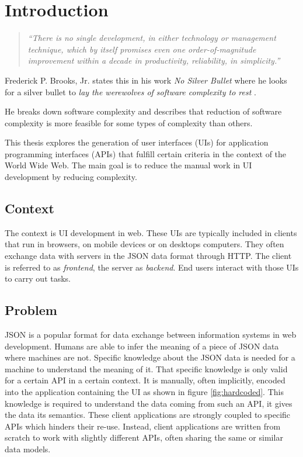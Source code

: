 \section{Introduction}\label{introduction}

\begin{quotation}
\textit{``There is no single development, in either technology or management technique, which by itself promises even one order-of-magnitude improvement within a decade in productivity, reliability, in simplicity.''} \citep[p.~1]{nosilverbullet}
\end{quotation}

Frederick P. Brooks, Jr. states this in his work \textit{No Silver Bullet} where he looks for a silver bullet to \textit{lay the werewolves of software complexity to rest} \citep[p.~1]{nosilverbullet}.

He breaks down software complexity and describes that reduction of software complexity is more feasible for some types of complexity than others.

This thesis explores the generation of user interfaces (UIs) for application programming interfaces (APIs) that fulfill certain criteria in the context of the World Wide Web. The main goal is to reduce the manual work in UI development by reducing complexity.

\subsection{Context}\label{context}
The context is UI development in web. These UIs are typically included in clients that run in browsers, on mobile devices or on desktops computers. They often exchange data with servers in the JSON data format \citep{jsonformat} through HTTP. The client is referred to as \textit{\gls{frontend}}, the server as \textit{\gls{backend}}. End users interact with those UIs to carry out tasks.

\subsection{Problem}\label{problem}
JSON is a popular format for data exchange between information systems in web development. Humans are able to infer the meaning of a piece of JSON data where machines are not. Specific knowledge about the JSON data is needed for a machine to understand the meaning of it. That specific knowledge is only valid for a certain API in a certain context. It is manually, often implicitly, encoded into the application containing the UI as shown in figure \ref{fig:hardcoded}. This knowledge is required to understand the data coming from such an API, it gives the data its semantics. These client applications are strongly coupled to specific APIs which hinders their re-use. Instead, client applications are written from scratch to work with slightly different APIs, often sharing the same or similar data models.

